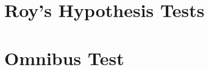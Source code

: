 \documentclass[main.tex]{subfiles}
\begin{document}
\section{Roy's  Hypothesis Tests}

\section{Omnibus Test}
\end{document}
